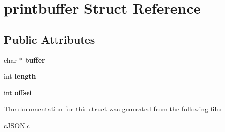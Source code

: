 \hypertarget{structprintbuffer}{}\section{printbuffer Struct Reference}
\label{structprintbuffer}
\subsection*{Public Attributes}
\begin{DoxyCompactItemize}
\item 
\mbox{\label{structprintbuffer_a5176d97bde8869f161c877e52767b350}} 
char $\ast$ {\bfseries buffer}
\item 
\mbox{\label{structprintbuffer_ae0320ae6fa335d537ce2ad2e09dabf61}} 
int {\bfseries length}
\item 
\mbox{\label{structprintbuffer_ac1e12f39d1f481112ccdb004235f7760}} 
int {\bfseries offset}
\end{DoxyCompactItemize}


The documentation for this struct was generated from the following file\+:\begin{DoxyCompactItemize}
\item 
c\+J\+S\+O\+N.\+c\end{DoxyCompactItemize}
